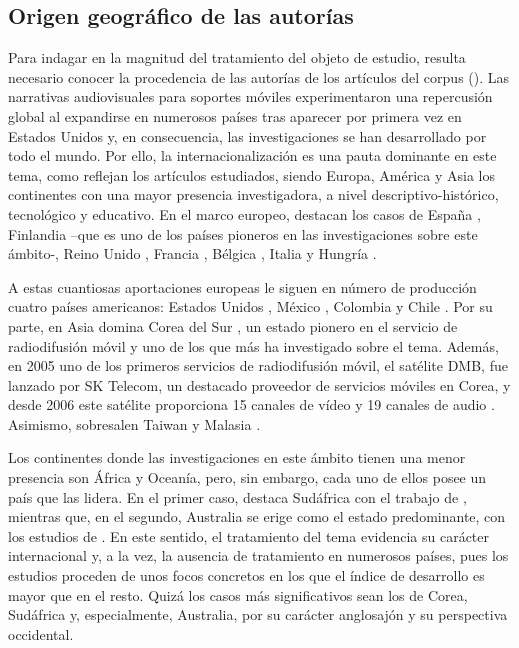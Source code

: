 \documentclass[spanish]{textolivre}
\begin{document}
\subsection{Origen geográfico de las autorías}
Para indagar en la magnitud del tratamiento del objeto de estudio, resulta necesario conocer la procedencia de las autorías de los artículos del corpus (). Las narrativas audiovisuales para soportes móviles experimentaron una repercusión global al expandirse en numerosos países tras aparecer por primera vez en Estados Unidos y, en consecuencia, las investigaciones se han desarrollado por todo el mundo. Por ello, la internacionalización es una pauta dominante en este tema, como reflejan los artículos estudiados, siendo Europa, América y Asia los continentes con una mayor presencia investigadora, a nivel descriptivo-histórico, tecnológico y educativo. En el marco europeo, destacan los casos de España \cite{adelantadomateu2011, mendiz-noguero2011, alonso2015, garin2017, gomez2007, tornero2019, morante2011, galindo2015, scolari2017, feijoo2010}, Finlandia \cite{jumiskopyykko2006, jumiskopyykko2008} –que es uno de los países pioneros en las investigaciones sobre este ámbito-, Reino Unido \cite{lochrie2012, orgad2009}, Francia \cite{figeac2009}, Bélgica \cite{evens2011}, Italia \cite{prario2007} y Hungría \cite{urban2007}.

A estas cuantiosas aportaciones europeas le siguen en número de producción cuatro países americanos: Estados Unidos \cite{mittell2017, hargraves2017, varan2013, dawson2012}, México \cite{barron2013, tamayofernandez2011}, Colombia \cite{montoyabermudez2016, rojas2013, rincon2011} y Chile \cite{phillippi-miranda2011, saez2010}. Por su parte, en Asia domina Corea del Sur \cite{shim2017, do2009}, un estado pionero en el servicio de radiodifusión móvil y uno de los que más ha investigado sobre el tema. Además, en 2005 uno de los primeros servicios de radiodifusión móvil, el satélite DMB, fue lanzado por SK Telecom, un destacado proveedor de servicios móviles en Corea, y desde 2006 este satélite proporciona 15 canales de vídeo y 19 canales de audio \cite{do2009}. Asimismo, sobresalen Taiwan \cite{su2015} y Malasia \cite{wong2016}. 

Los continentes donde las investigaciones en este ámbito tienen una menor presencia son África y Oceanía, pero, sin embargo, cada uno de ellos posee un país que las lidera. En el primer caso, destaca Sudáfrica con el trabajo de \textcite{chuchu2014}, mientras que, en el segundo, Australia se erige como el estado predominante, con los estudios de \textcite{goggin2012, monaghan2017, varan2013}. En este sentido, el tratamiento del tema evidencia su carácter internacional y, a la vez, la ausencia de tratamiento en numerosos países, pues los estudios proceden de unos focos concretos en los que el índice de desarrollo es mayor que en el resto. Quizá los casos más significativos sean los de Corea, Sudáfrica y, especialmente, Australia, por su carácter anglosajón y su perspectiva occidental.  
\end{document}
